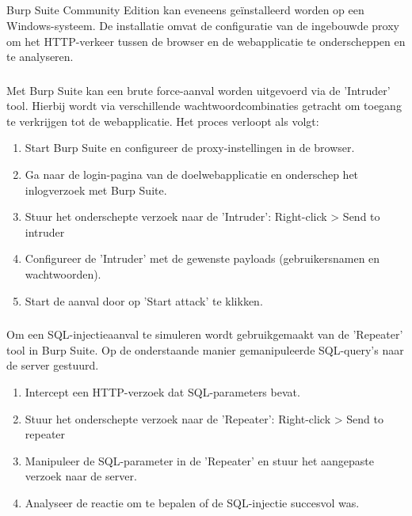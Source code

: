 \subsection{}
Burp Suite Community Edition kan eveneens geïnstalleerd worden op een Windows-systeem. De installatie omvat de configuratie 
van de ingebouwde proxy om het HTTP-verkeer tussen de browser en de webapplicatie te onderscheppen en te analyseren.

\subsubsection{}
Met Burp Suite kan een brute force-aanval worden uitgevoerd via de 'Intruder' tool. Hierbij wordt via verschillende wachtwoordcombinaties 
getracht om toegang te verkrijgen tot de webapplicatie. Het proces verloopt als volgt:
\begin{enumerate}
    \item Start Burp Suite en configureer de proxy-instellingen in de browser.
    \item Ga naar de login-pagina van de doelwebapplicatie en onderschep het inlogverzoek met Burp Suite.
    \item Stuur het onderschepte verzoek naar de 'Intruder': Right-click > Send to intruder
    \item Configureer de 'Intruder' met de gewenste payloads (gebruikersnamen en wachtwoorden).
    \item Start de aanval door op 'Start attack' te klikken.
\end{enumerate}

\subsubsection{}
Om een SQL-injectieaanval te simuleren wordt gebruikgemaakt van de 'Repeater' tool in Burp Suite. Op de onderstaande manier gemanipuleerde SQL-query's naar de 
server gestuurd.
\begin{enumerate}
    \item Intercept een HTTP-verzoek dat SQL-parameters bevat.
    \item Stuur het onderschepte verzoek naar de 'Repeater': Right-click > Send to repeater
    \item Manipuleer de SQL-parameter in de 'Repeater' en stuur het aangepaste verzoek naar de server.
    \item Analyseer de reactie om te bepalen of de SQL-injectie succesvol was.
\end{enumerate}

